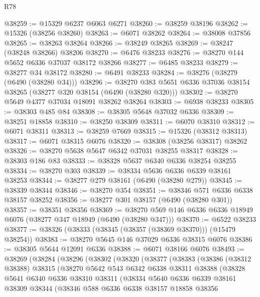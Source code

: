 \begin{lexlean}{R78}
\begin{coremodule}
@38259 := @15329 @6237 @6063 @6271
@38260 := @38259 @38196
@38262 := @15326 (@38256 @38260)
@38263 := @6071 @38262
@38264 := @38008 @37856
@38265 := @38263 @38264
@38266 := @38249 @38265
@38269 := @38247 (@38248 @38266) @38206
@38270 := @6476 @38233
@38276 := @38270 @144 @5652 @6336 @37037 @38172 @38266
@38277 := @6485 @38233
@38279 := @38277 @34 @38172
@38280 := @6491 @38233
@38284 := @38276 (@38279 (@6490 (@38280 @34)))
@38296 := @38270 @383 @5651 @6336 @37036 @38154 @38265 (@38277 @320 @38154 (@6490 (@38280 @320)))
@38302 := @38270 @5649 @4377 @37034 @18091 @38262 @38264
@38303 := @6938 @38233
@38305 := @38303 @485 @84
@38308 := @38305 @5648 @37032 @6336
@38309 := @38251 @18858
@38310 := @38250 @38309
@38311 := @6070 @38310
@38312 := @6071 @38311
@38313 := @38259 @7669
@38315 := @15326 (@38312 @38313)
@38317 := @6071 @38315 @6076
@38320 := @38308 (@38256 @38317) @38262
@38326 := @38270 @5638 @5647 @6342 @37031 @38255 @38317
@38328 := @38303 @186 @83
@38333 := @38328 @5637 @6340 @6336 @38254 @38255
@38334 := @38270 @303
@38339 := @38334 @5636 @6336 @6339 @38161 @38253
@38344 := @38277 @279 @38161 (@6490 (@38280 @279))
@38345 := @38339 @38344
@38346 := @38270 @354
@38351 := @38346 @571 @6336 @6338 @38157 @38252
@38356 := @38277 @301 @38157 (@6490 (@38280 @301))
@38357 := @38351 @38356
@38369 := @38270 @569 @146 @6336 @6336 @18949 @6076 (@38277 @347 @18949 (@6490 (@38280 @347)))
@38370 := @6522 @38233
@38377 := @38326 (@38333 (@38345 (@38357 (@38369 @38370))) (@15479 @38254))
@38383 := @38270 @5645 @146 @37029 @6336 @38315 @6076
@38386 := @38305 @5644 @12091 @6336
@38388 := @6071 @38166 @6076
@38493 := @38269
    (@38284
      (@38296
        (@38302
          (@38320
            (@38377
              (@38383
                (@38386
                  (@38312 @38388)
                  @38315
                  (@38270
                    @5642
                    @543
                    @6342
                    @6338
                    @38311
                    @38388
                    (@38328
                      @5641
                      @6340
                      @6336
                      @38310
                      @38311
                      (@38334
                        @5640
                        @6336
                        @6339
                        @38161
                        @38309
                        @38344
                        (@38346
                          @588
                          @6336
                          @6338
                          @38157
                          @18858
                          @38356

\end{coremodule}
\end{lexlean}
